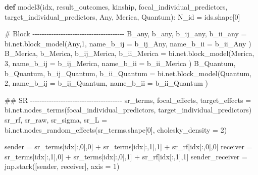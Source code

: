 \documentclass[
  letterpaper,
  DIV=11,
  numbers=noendperiod]{scrreprt}
\newenvironment{Shaded}{\begin{snugshade}}{\end{snugshade}}
\newcommand{\CommentTok}[1]{\textcolor[rgb]{0.37,0.37,0.37}{#1}}
\newcommand{\DecValTok}[1]{\textcolor[rgb]{0.68,0.00,0.00}{#1}}
\newcommand{\KeywordTok}[1]{\textcolor[rgb]{0.00,0.23,0.31}{\textbf{#1}}}
\newcommand{\NormalTok}[1]{\textcolor[rgb]{0.00,0.23,0.31}{#1}}
\newcommand{\OperatorTok}[1]{\textcolor[rgb]{0.37,0.37,0.37}{#1}}
\newcommand{\StringTok}[1]{\textcolor[rgb]{0.13,0.47,0.30}{#1}}
\begin{document}
\begin{Shaded}
\begin{Highlighting}[]
\KeywordTok{def}\NormalTok{ model3(idx, result\_outcomes, kinship, focal\_individual\_predictors, target\_individual\_predictors, Any, Merica, Quantum):}
\NormalTok{    N\_id }\OperatorTok{=}\NormalTok{ ids.shape[}\DecValTok{0}\NormalTok{]}

    \CommentTok{\# Block {-}{-}{-}{-}{-}{-}{-}{-}{-}{-}{-}{-}{-}{-}{-}{-}{-}{-}{-}{-}{-}{-}{-}{-}{-}{-}{-}{-}{-}{-}{-}{-}{-}{-}{-}{-}{-}{-}{-}}
\NormalTok{    B\_any, b\_any, b\_ij\_any, b\_ii\_any }\OperatorTok{=}\NormalTok{ bi.net.block\_model(Any,}\DecValTok{1}\NormalTok{, name\_b\_ij }\OperatorTok{=} \StringTok{\textquotesingle{}b\_ij\_Any\textquotesingle{}}\NormalTok{, name\_b\_ii }\OperatorTok{=} \StringTok{\textquotesingle{}b\_ii\_Any\textquotesingle{}}\NormalTok{ )}
\NormalTok{    B\_Merica, b\_Merica, b\_ij\_Merica, b\_ii\_Merica }\OperatorTok{=}\NormalTok{ bi.net.block\_model(Merica,  }\DecValTok{3}\NormalTok{, name\_b\_ij }\OperatorTok{=} \StringTok{\textquotesingle{}b\_ij\_Merica\textquotesingle{}}\NormalTok{, name\_b\_ii }\OperatorTok{=} \StringTok{\textquotesingle{}b\_ii\_Merica\textquotesingle{}}\NormalTok{ )}
\NormalTok{    B\_Quantum, b\_Quantum, b\_ij\_Quantum, b\_ii\_Quantum }\OperatorTok{=}\NormalTok{ bi.net.block\_model(Quantum, }\DecValTok{2}\NormalTok{, name\_b\_ij }\OperatorTok{=} \StringTok{\textquotesingle{}b\_ij\_Quantum\textquotesingle{}}\NormalTok{, name\_b\_ii }\OperatorTok{=} \StringTok{\textquotesingle{}b\_ii\_Quantum\textquotesingle{}}\NormalTok{ )}

    \CommentTok{\#\# SR {-}{-}{-}{-}{-}{-}{-}{-}{-}{-}{-}{-}{-}{-}{-}{-}{-}{-}{-}{-}{-}{-}{-}{-}{-}{-}{-}{-}{-}{-}{-}{-}{-}{-}{-}{-}{-}{-}{-}}
\NormalTok{    sr\_terms, focal\_effects, target\_effects }\OperatorTok{=}\NormalTok{ bi.net.nodes\_terms(focal\_individual\_predictors, target\_individual\_predictors)}
\NormalTok{    sr\_rf, sr\_raw, sr\_sigma, sr\_L }\OperatorTok{=}\NormalTok{ bi.net.nodes\_random\_effects(sr\_terms.shape[}\DecValTok{0}\NormalTok{], cholesky\_density }\OperatorTok{=} \DecValTok{2}\NormalTok{)}

\NormalTok{    sender }\OperatorTok{=}\NormalTok{ sr\_terms[idx[:,}\DecValTok{0}\NormalTok{],}\DecValTok{0}\NormalTok{] }\OperatorTok{+}\NormalTok{ sr\_terms[idx[:,}\DecValTok{1}\NormalTok{],}\DecValTok{1}\NormalTok{] }\OperatorTok{+}\NormalTok{ sr\_rf[idx[:,}\DecValTok{0}\NormalTok{],}\DecValTok{0}\NormalTok{]}
\NormalTok{    receiver }\OperatorTok{=}\NormalTok{  sr\_terms[idx[:,}\DecValTok{1}\NormalTok{],}\DecValTok{0}\NormalTok{] }\OperatorTok{+}\NormalTok{ sr\_terms[idx[:,}\DecValTok{0}\NormalTok{],}\DecValTok{1}\NormalTok{] }\OperatorTok{+}\NormalTok{ sr\_rf[idx[:,}\DecValTok{1}\NormalTok{],}\DecValTok{1}\NormalTok{]}
\NormalTok{    sender\_receiver }\OperatorTok{=}\NormalTok{ jnp.stack([sender, receiver], axis }\OperatorTok{=} \DecValTok{1}\NormalTok{)}


\end{Highlighting}
\end{Shaded}
\end{document}
